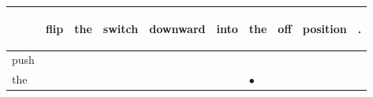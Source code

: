 \documentclass[landscape]{article}
\newcommand{\ssp}{\hspace{2pt}}
\newcommand{\mex}{\cellcolor{g}$\bullet$}
\begin{document}
\noindent\begin{tabular}{|l|p{10pt}|p{10pt}|p{10pt}|p{10pt}|p{10pt}|p{10pt}|p{10pt}|p{10pt}|p{10pt}|}
\hline
&\begin{sideways}\cellcolor{ref0}flip\hspace{12pt}\end{sideways}&\begin{sideways}\cellcolor{ref1}the\hspace{12pt}\end{sideways}&\begin{sideways}\cellcolor{ref2}switch\hspace{12pt}\end{sideways}&\begin{sideways}\cellcolor{ref3}downward\hspace{12pt}\end{sideways}&\begin{sideways}\cellcolor{ref4}into\hspace{12pt}\end{sideways}&\begin{sideways}\cellcolor{ref5}the\hspace{12pt}\end{sideways}&\begin{sideways}\cellcolor{ref6}off\hspace{12pt}\end{sideways}&\begin{sideways}\cellcolor{ref7}position\hspace{12pt}\end{sideways}&\begin{sideways}\cellcolor{ref8}.\hspace{12pt}\end{sideways}\\
\hline
\ssp push \ssp&\hspace{2pt}&\hspace{2pt}&\hspace{2pt}&\hspace{2pt}&\hspace{2pt}&\hspace{2pt}&\hspace{2pt}&\hspace{2pt}&\hspace{2pt}\\
\hline
\ssp \cellcolor{ref5}the \ssp&\hspace{2pt}&\hspace{2pt}&\hspace{2pt}&\hspace{2pt}&\hspace{2pt}&\hspace{2pt}\mex&\hspace{2pt}&\hspace{2pt}&\hspace{2pt}\\

\end{tabular}
\end{document}
